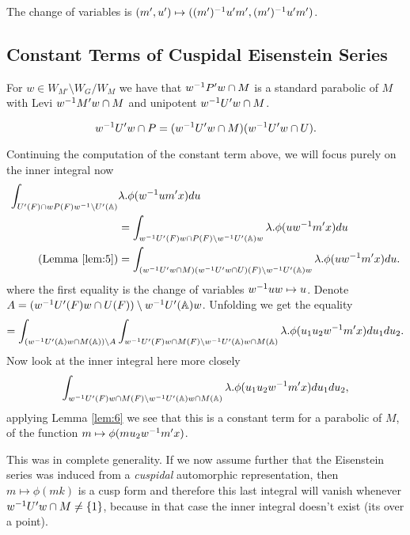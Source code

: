     The change of variables is \((m', u') \mapsto ((m')^{-1} u' m', (m')^{-1} u' m')\).

\subsection{Constant Terms of Cuspidal Eisenstein Series}
\begin{Lemma}\label{lem:4}
        For \(w\in W_{M'}\setminus W_G / W_{M} \) we have that \(w^{-1} P'w\cap M\) is a standard parabolic of \(M\) with Levi \(w^{-1} M'w\cap M\) and unipotent \(w^{-1} U'w\cap M\).
    \end{Lemma}
    \begin{Lemma}\label{lem:5}
        \[w^{-1} U' w \cap P = (w^{-1} U' w \cap M)(w^{-1} U' w \cap U).\]
    \end{Lemma}
    
    Continuing the computation of the constant term above, we will focus purely on the inner integral now
    \begin{equation*}
        \begin{aligned}
            \int_{U'(F)\cap wP(F)w\inv \setminus U'(\A)}& \lambda.\phi( w\inv um' x)  du \\&= \int_{w\inv U'(F)w \cap P(F) \setminus w\inv U'(\A)w} \lambda.\phi( uw\inv m' x)  du \\
            (\text{Lemma \ref{lem:5}})&= \int_{(w\inv U' w \cap M)(w\inv U' w \cap U)(F) \setminus w\inv U'(\A)w} \lambda.\phi( uw\inv m' x)  du . \\
        \end{aligned}
    \end{equation*}
    where the first equality is the change of variables \(w^{-1} u w\mapsto u \). Denote \(A = (w\inv U'(F) w \cap U(F) ) \setminus w\inv U'(\A)w \). Unfolding we get the equality
    \[= \int_{(w\inv U'(\A)w \cap M(\A)) \setminus A} \int_{w\inv U'(F) w \cap M(F) \setminus w\inv U'(\A)w \cap M(\A)} \lambda.\phi( u_1 u_2 w\inv m' x)  du_1 du_2.\]
     Now look at the inner integral here more closely 
    \[ \int_{w\inv U'(F) w \cap M(F) \setminus w\inv U'(\A)w \cap M(\A)}\lambda. \phi( u_1 u_2 w\inv m' x)  du_1 du_2,\]
    applying Lemma \ref{lem:6} we see that this is a constant term for a parabolic of \(M\), of the function \(m\mapsto \phi(m u_2 w\inv m' x)\). 
\begin{comment}
	    \begin{Lemma}
        \(u_2 w\inv m' x \in K\) with variables as above.
    \end{Lemma}
\end{comment}
    This was in complete generality. If we now assume further that the Eisenstein series was induced from a \textit{cuspidal} automorphic representation, then \(m\mapsto \phi(mk)\) is a cusp form and therefore this last integral will vanish whenever \(w^{-1} U'w \cap M \neq \{1\}\), because in that case the inner integral doesn't exist (its over a point).

